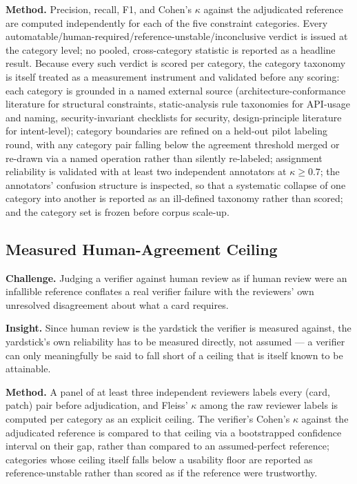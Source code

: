 \documentclass[11pt]{article}
\begin{document}
\textbf{Method.} Precision, recall, F1, and Cohen's $\kappa$ against the adjudicated reference are computed independently for each of the five constraint categories. Every automatable/human-required/reference-unstable/inconclusive verdict is issued at the category level; no pooled, cross-category statistic is reported as a headline result. Because every such verdict is scored per category, the category taxonomy is itself treated as a measurement instrument and validated before any scoring: each category is grounded in a named external source (architecture-conformance literature for structural constraints, static-analysis rule taxonomies for API-usage and naming, security-invariant checklists for security, design-principle literature for intent-level); category boundaries are refined on a held-out pilot labeling round, with any category pair falling below the agreement threshold merged or re-drawn via a named operation rather than silently re-labeled; assignment reliability is validated with at least two independent annotators at $\kappa \geq 0.7$; the annotators' confusion structure is inspected, so that a systematic collapse of one category into another is reported as an ill-defined taxonomy rather than scored; and the category set is frozen before corpus scale-up.

\subsection{Measured Human-Agreement Ceiling}
\textbf{Challenge.} Judging a verifier against human review as if human review were an infallible reference conflates a real verifier failure with the reviewers' own unresolved disagreement about what a card requires.

\textbf{Insight.} Since human review is the yardstick the verifier is measured against, the yardstick's own reliability has to be measured directly, not assumed --- a verifier can only meaningfully be said to fall short of a ceiling that is itself known to be attainable.

\textbf{Method.} A panel of at least three independent reviewers labels every (card, patch) pair before adjudication, and Fleiss' $\kappa$ among the raw reviewer labels is computed per category as an explicit ceiling. The verifier's Cohen's $\kappa$ against the adjudicated reference is compared to that ceiling via a bootstrapped confidence interval on their gap, rather than compared to an assumed-perfect reference; categories whose ceiling itself falls below a usability floor are reported as reference-unstable rather than scored as if the reference were trustworthy.
\end{document}
